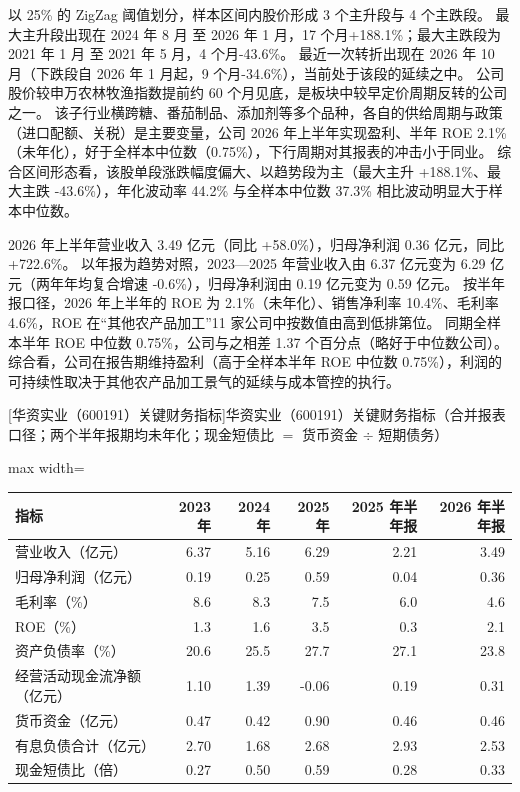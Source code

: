 以 25\% 的 ZigZag 阈值划分，样本区间内股价形成 3 个主升段与 4 个主跌段。 最大主升段出现在 2024 年 8 月 至 2026 年 1 月，17 个月+188.1\%；最大主跌段为 2021 年 1 月 至 2021 年 5 月，4 个月-43.6\%。 最近一次转折出现在 2026 年 10 月（下跌段自 2026 年 1 月起，9 个月-34.6\%），当前处于该段的延续之中。 公司股价较申万农林牧渔指数提前约 60 个月见底，是板块中较早定价周期反转的公司之一。 该子行业横跨糖、番茄制品、添加剂等多个品种，各自的供给周期与政策（进口配额、关税）是主要变量，公司 2026 年上半年实现盈利、半年 ROE 2.1\%（未年化），好于全样本中位数（0.75\%），下行周期对其报表的冲击小于同业。 综合区间形态看，该股单段涨跌幅度偏大、以趋势段为主（最大主升 +188.1\%、最大主跌 -43.6\%），年化波动率 44.2\% 与全样本中位数 37.3\% 相比波动明显大于样本中位数。

 2026 年上半年营业收入 3.49 亿元（同比 +58.0\%），归母净利润 0.36 亿元，同比 +722.6\%。 以年报为趋势对照，2023---2025 年营业收入由 6.37 亿元变为 6.29 亿元（两年年均复合增速 -0.6\%），归母净利润由 0.19 亿元变为 0.59 亿元。 按半年报口径，2026 年上半年的 ROE 为 2.1\%（未年化）、销售净利率 10.4\%、毛利率 4.6\%，ROE 在“其他农产品加工”11 家公司中按数值由高到低排第位。 同期全样本半年 ROE 中位数 0.75\%，公司与之相差 1.37 个百分点（略好于中位数公司）。 综合看，公司在报告期维持盈利（高于全样本半年 ROE 中位数 0.75\%），利润的可持续性取决于其他农产品加工景气的延续与成本管控的执行。

\begin{center}\small\setlength{\tabcolsep}{3.4pt}
[华资实业（600191）关键财务指标]{华资实业（600191）关键财务指标（合并报表口径；两个半年报期均未年化；现金短债比 $=$ 货币资金 $\div$ 短期债务）}
\begin{adjustbox}{max width=\textwidth}
\begin{tabular}{@{}lrrrrr@{}}
\toprule
指标 & 2023 年 & 2024 年 & 2025 年 & 2025 年半年报 & 2026 年半年报 \\
\midrule
营业收入（亿元） & 6.37 & 5.16 & 6.29 & 2.21 & 3.49 \\
归母净利润（亿元） & 0.19 & 0.25 & 0.59 & 0.04 & 0.36 \\
毛利率（\%） & 8.6 & 8.3 & 7.5 & 6.0 & 4.6 \\
ROE（\%） & 1.3 & 1.6 & 3.5 & 0.3 & 2.1 \\
资产负债率（\%） & 20.6 & 25.5 & 27.7 & 27.1 & 23.8 \\
经营活动现金流净额（亿元） & 1.10 & 1.39 & -0.06 & 0.19 & 0.31 \\
货币资金（亿元） & 0.47 & 0.42 & 0.90 & 0.46 & 0.46 \\
有息负债合计（亿元） & 2.70 & 1.68 & 2.68 & 2.93 & 2.53 \\
现金短债比（倍） & 0.27 & 0.50 & 0.59 & 0.28 & 0.33 \\
\bottomrule
\end{tabular}
\end{adjustbox}
\end{center}

